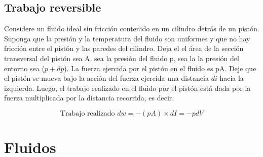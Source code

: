 \subsection{Trabajo reversible}

Considere un fluido ideal sin fricción contenido en un cilindro detrás de un pistón.
Suponga que la presión y la temperatura del fluido son uniformes y que
no hay fricción entre el pistón y las paredes del cilindro. Deja el
el área de la sección transversal del pistón sea A, sea la presión del fluido p, sea la
la presión del entorno sea ($p + dp$). La fuerza ejercida por el
pistón en el fluido es pA. Deje que el pistón se mueva bajo la acción del
fuerza ejercida una distancia $di$ hacia la izquierda. Luego, el trabajo realizado en el fluido por el pistón está dada por la fuerza multiplicada por la distancia recorrida, es decir. 

\begin{equation}
    \text{Trabajo realizado } dw=-(pA)\times dI=-pdV
\end{equation}

\section{Fluidos}

